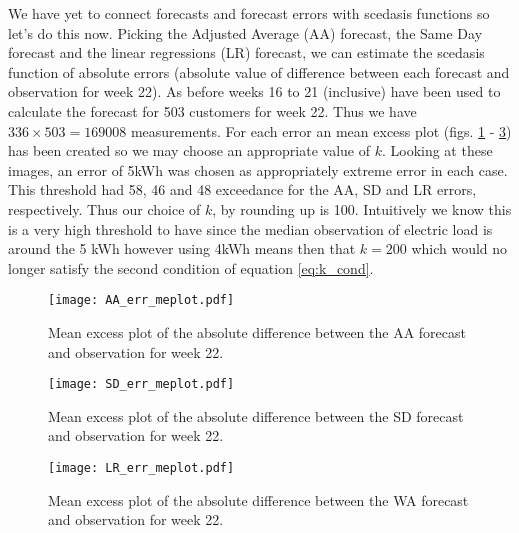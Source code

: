 We have yet to connect forecasts and forecast errors with scedasis functions so let's do this now. Picking the Adjusted Average (AA) forecast, the Same Day forecast and the linear regressions (LR) forecast, we can estimate the scedasis function of absolute errors (absolute value of difference between each forecast and observation for week 22). As before weeks 16 to 21 (inclusive) have been used to calculate the forecast for 503 customers for week 22. Thus we have $336 \times 503 = 169008$ measurements. For each error an mean excess plot (figs. \ref{fig:AA_err_me} - \ref{fig:LR_err_me}) has been created so we may choose an appropriate value of $k$. Looking at these images, an error of 5kWh was chosen as appropriately extreme error in each case. This threshold had 58, 46 and 48 exceedance for the AA, SD and LR errors, respectively. Thus our choice of $k$, by rounding up is 100. Intuitively we know this is a very high threshold to have since the median observation of electric load is around the 5 kWh however using 4kWh means then that $k=200$ which would no longer satisfy the second condition of equation \ref{eq:k_cond}. 

\begin{figure}
\centering
\texttt{[image: AA\_err\_meplot.pdf]}
\caption{\label{fig:AA_err_me} Mean excess plot of the absolute difference between the AA forecast and observation for week 22.}
\end{figure}

\begin{figure}
\centering
\texttt{[image: SD\_err\_meplot.pdf]}
\caption{\label{fig:SD_err_me} Mean excess plot of the absolute difference between the SD forecast and observation for week 22.}
\end{figure}

\begin{figure}
\centering
\texttt{[image: LR\_err\_meplot.pdf]}
\caption{\label{fig:LR_err_me} Mean excess plot of the absolute difference between the WA forecast and observation for week 22.}
\end{figure}

